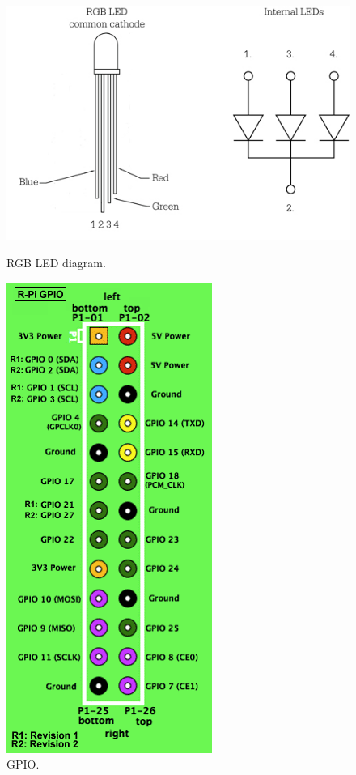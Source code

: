 \begin{figure}
	\begin{minipage}[t]{0.4\linewidth}
		\centering
			\includegraphics[width=0.30\paperwidth]{Pictures/rgb_led_diagram.jpg}
		\caption{RGB LED diagram. }
		\label{fig:rgb-led}
	\end{minipage}
	\hspace{1cm}
	\begin{minipage}[t]{0.4\linewidth}
		\centering
			\includegraphics[width=0.20\paperwidth]{Pictures/GPIOs.png}
		\caption{\rpi{} GPIO. }
		\label{fig:rpigpio}
	\end{minipage}
\end{figure}

